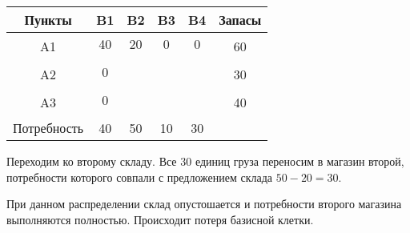 \documentclass[a4paper,12pt]{article}
\begin{document}
	\begin{center}
		\begin{tabular}{|c|c|c|c|c|c|c|c|c|c}
			\hline
			Пункты & \multicolumn{2}{c|}{B1} & \multicolumn{2}{c|}{B2} & \multicolumn{2}{c|}{B3} & \multicolumn{2}{c|}{B4} & \multicolumn{1}{c|}{Запасы} \\ \hline
			\multirow{2}{*}{A1} & \multicolumn{2}{c|}{40} & \multicolumn{2}{c|}{20} & \multicolumn{2}{c|}{0} & \multicolumn{2}{c|}{0} & \multicolumn{1}{c|}{\multirow{2}{*}{60}} \\ \cline{2-9}
			&  &  &  &  &  &  &  &  & \multicolumn{1}{c|}{} \\ \hline
			\multirow{2}{*}{A2} & \multicolumn{2}{c|}{0} & \multicolumn{2}{c|}{} & \multicolumn{2}{c|}{} & \multicolumn{2}{c|}{} & \multicolumn{1}{c|}{\multirow{2}{*}{30}} \\ \cline{2-9}
			&  &  &  &  &  &  &  &  & \multicolumn{1}{c|}{} \\ \hline
			\multirow{2}{*}{A3} & \multicolumn{2}{c|}{0} & \multicolumn{2}{c|}{} & \multicolumn{2}{c|}{} & \multicolumn{2}{c|}{} & \multicolumn{1}{c|}{\multirow{2}{*}{40}} \\ \cline{2-9}
			&  &  &  &  &  &  &  &  & \multicolumn{1}{c|}{} \\ \hline
			Потребность & \multicolumn{2}{c|}{40} & \multicolumn{2}{c|}{50} & \multicolumn{2}{c|}{10} & \multicolumn{2}{c|}{30} &  \\ \cline{1-9}
		\end{tabular}
	\end{center}

	Переходим ко второму складу. Все $30$ единиц груза переносим в магазин второй, потребности которого совпали с предложением склада $50 - 20 = 30$.
	
	При данном распределении склад опустошается и потребности второго магазина выполняются полностью. Происходит потеря базисной клетки.
	
\end{document}
